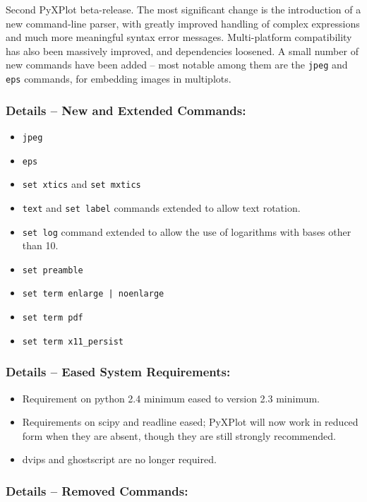 \documentclass[a4paper,onecolumn,11pt]{book}
\begin{document}
Second PyXPlot beta-release. The most significant change is the introduction of
a new command-line parser, with greatly improved handling of complex
expressions and much more meaningful syntax error messages. Multi-platform
compatibility has also been massively improved, and dependencies loosened.  A
small number of new commands have been added -- most notable among them are the
{\tt jpeg} and {\tt eps} commands, for embedding images in multiplots.

\subsubsection*{Details -- New and Extended Commands:}

\begin{itemize}
\item {\tt jpeg}
\item {\tt eps}
\item {\tt set xtics} and {\tt set mxtics}
\item {\tt text} and {\tt set label} commands extended to allow text rotation.
\item {\tt set log} command extended to allow the use of logarithms with bases other than 10.
\item {\tt set preamble}
\item {\tt set term enlarge | noenlarge}
\item {\tt set term pdf}
\item {\tt set term x11\_persist}
\end{itemize}

\subsubsection*{Details -- Eased System Requirements:}

\begin{itemize}
\item Requirement on python 2.4 minimum eased to version 2.3 minimum.
\item Requirements on scipy and readline eased; PyXPlot will now work in reduced form when they are absent, though they are still strongly recommended.
\item dvips and ghostscript are no longer required.
\end{itemize}

\subsubsection*{Details -- Removed Commands:}
\end{document}

